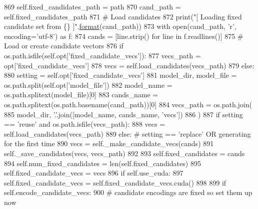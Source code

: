 \begin{DoxyCode}
869                         self.fixed\_candidates\_path = path
870                         cand\_path = self.fixed\_candidates\_path
871                 \textcolor{comment}{# Load candidates}
872                 print(\textcolor{stringliteral}{"[ Loading fixed candidate set from \{\} ]"}.\hyperlink{namespaceparlai_1_1chat__service_1_1services_1_1messenger_1_1shared__utils_a32e2e2022b824fbaf80c747160b52a76}{format}(cand\_path))
873                 with open(cand\_path, \textcolor{stringliteral}{'r', encoding='}utf-8') as f:
874                     cands = [line.strip() \textcolor{keywordflow}{for} line \textcolor{keywordflow}{in} f.readlines()]
875                 \textcolor{comment}{# Load or create candidate vectors}
876                 \textcolor{keywordflow}{if} os.path.isfile(self.opt[\textcolor{stringliteral}{'fixed\_candidate\_vecs'}]):
877                     vecs\_path = opt[\textcolor{stringliteral}{'fixed\_candidate\_vecs'}]
878                     vecs = self.load\_candidates(vecs\_path)
879                 \textcolor{keywordflow}{else}:
880                     setting = self.opt[\textcolor{stringliteral}{'fixed\_candidate\_vecs'}]
881                     model\_dir, model\_file = os.path.split(self.opt[\textcolor{stringliteral}{'model\_file'}])
882                     model\_name = os.path.splitext(model\_file)[0]
883                     cands\_name = os.path.splitext(os.path.basename(cand\_path))[0]
884                     vecs\_path = os.path.join(
885                         model\_dir, \textcolor{stringliteral}{'.'}.join([model\_name, cands\_name, \textcolor{stringliteral}{'vecs'}])
886                     )
887                     \textcolor{keywordflow}{if} setting == \textcolor{stringliteral}{'reuse'} \textcolor{keywordflow}{and} os.path.isfile(vecs\_path):
888                         vecs = self.load\_candidates(vecs\_path)
889                     \textcolor{keywordflow}{else}:  \textcolor{comment}{# setting == 'replace' OR generating for the first time}
890                         vecs = self.\_make\_candidate\_vecs(cands)
891                         self.\_save\_candidates(vecs, vecs\_path)
892 
893                 self.fixed\_candidates = cands
894                 self.num\_fixed\_candidates = len(self.fixed\_candidates)
895                 self.fixed\_candidate\_vecs = vecs
896                 \textcolor{keywordflow}{if} self.use\_cuda:
897                     self.fixed\_candidate\_vecs = self.fixed\_candidate\_vecs.cuda()
898 
899                 \textcolor{keywordflow}{if} self.encode\_candidate\_vecs:
900                     \textcolor{comment}{# candidate encodings are fixed so set them up now}

\end{DoxyCode}
